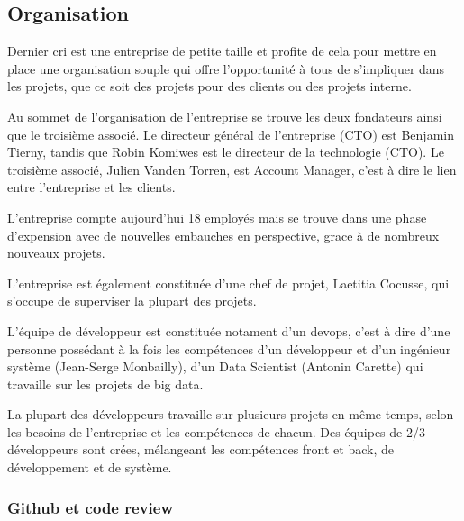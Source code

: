\bigskip

\subsection{Organisation}\label{organisation}

\bigskip

Dernier cri est une entreprise de petite taille et profite de cela pour
mettre en place une organisation souple qui offre l'opportunité à tous
de s'impliquer dans les projets, que ce soit des projets pour des
clients ou des projets interne.

\bigskip

Au sommet de l'organisation de l'entreprise se trouve les deux
fondateurs ainsi que le troisième associé. Le directeur général de
l'entreprise (CTO) est Benjamin Tierny, tandis que Robin Komiwes est le
directeur de la technologie (CTO). Le troisième associé, Julien Vanden
Torren, est Account Manager, c'est à dire le lien entre l'entreprise et
les clients.

\bigskip

L'entreprise compte aujourd'hui 18 employés mais se trouve dans une
phase d'expension avec de nouvelles embauches en perspective, grace à de
nombreux nouveaux projets.

\bigskip

L'entreprise est également constituée d'une chef de projet, Laetitia
Cocusse, qui s'occupe de superviser la plupart des projets.

\bigskip

L'équipe de développeur est constituée notament d'un devops, c'est à
dire d'une personne possédant à la fois les compétences d'un développeur
et d'un ingénieur système (Jean-Serge Monbailly), d'un Data Scientist
(Antonin Carette) qui travaille sur les projets de big data.

\bigskip

La plupart des développeurs travaille sur plusieurs projets en même
temps, selon les besoins de l'entreprise et les compétences de chacun.
Des équipes de 2/3 développeurs sont crées, mélangeant les compétences
front et back, de développement et de système.

\bigskip

\subsubsection{Github et code review}\label{github-et-code-review}

\bigskip


